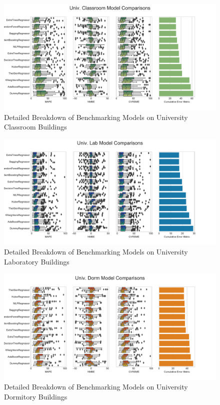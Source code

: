 \documentclass[preprint,12pt]{elsarticle}
\begin{document}
\begin{figure}[ht!]
\begin{center}
\includegraphics[width=1\columnwidth]{figures/UnivClass_boxplot.pdf}
\caption{Detailed Breakdown of Benchmarking Models on University Classroom Buildings}
\label{fig:class}%
\end{center}
\end{figure}

\begin{figure}[ht!]
\begin{center}
\includegraphics[width=1\columnwidth]{figures/UnivLab_boxplot.pdf}
\caption{Detailed Breakdown of Benchmarking Models on University Laboratory Buildings}
\label{fig:lab}%
\end{center}
\end{figure}

\begin{figure}[ht!]
\begin{center}
\includegraphics[width=1\columnwidth]{figures/UnivDorm_boxplot.pdf}
\caption{Detailed Breakdown of Benchmarking Models on University Dormitory Buildings}
\label{fig:dorms}%
\end{center}
\end{figure}
\end{document}
